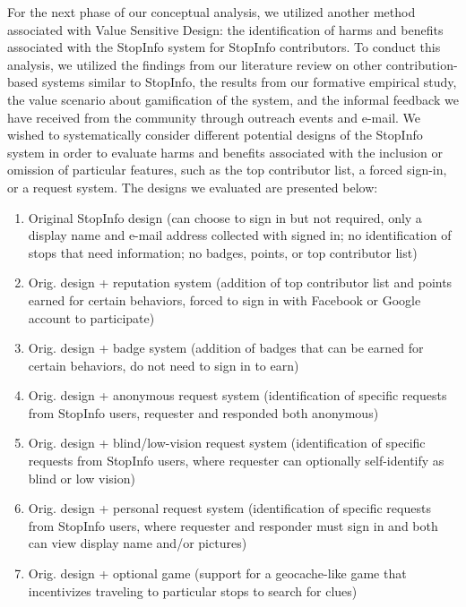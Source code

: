 For the next phase of our conceptual analysis, we utilized another method associated with Value Sensitive Design: the identification of harms and benefits associated with the StopInfo system for StopInfo contributors. To conduct this analysis, we utilized the findings from our literature review on other contribution-based systems similar to StopInfo, the results from our formative empirical study, the value scenario about gamification of the system, and the informal feedback we have received from the community through outreach events and e-mail. We wished to systematically consider different potential designs of the StopInfo system in order to evaluate harms and benefits associated with the inclusion or omission of particular features, such as the top contributor list, a forced sign-in, or a request system. The designs we evaluated are presented below:

\begin{enumerate}[leftmargin=8mm]
\item Original StopInfo design (can choose to sign in but not required, only a display name and e-mail address collected with signed in; no identification of stops that need information; no badges, points, or top contributor list)
\item Orig. design + reputation system (addition of top contributor list and points earned for certain behaviors, forced to sign in with Facebook or Google account to participate)
\item Orig. design + badge system (addition of badges that can be earned for certain behaviors, do not need to sign in to earn)
\item Orig. design + anonymous request system (identification of specific requests from StopInfo users, requester and responded both anonymous)
\item Orig. design + blind/low-vision request system (identification of specific requests from StopInfo users, where requester can optionally self-identify as blind or low vision)
\item Orig. design + personal request system (identification of specific requests from StopInfo users, where requester and responder must sign in and both can view display name and/or pictures) 
\item Orig. design + optional game (support for a geocache-like game that incentivizes traveling to particular stops to search for clues)
\end{enumerate}

